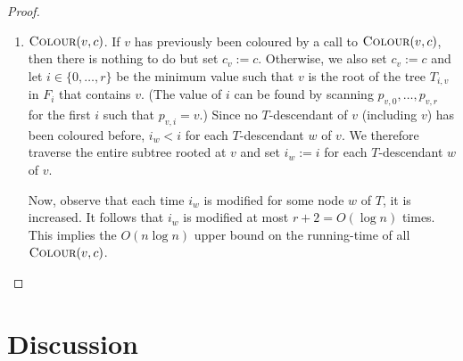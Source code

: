 \documentclass[kpfonts]{patmorin}
\begin{document}
\begin{proof}
\begin{enumerate}
     \item $\textsc{Colour}(v,c)$. If $v$ has previously been coloured by a call to $\textsc{Colour}(v,c)$, then there is nothing to do but set $c_v:=c$.  Otherwise, we also set $c_v:=c$ and let $i\in\{0,\ldots,r\}$ be the minimum value such that $v$ is the root of the tree $T_{i,v}$ in $F_i$ that contains $v$.  (The value of $i$ can be found by scanning $p_{v,0},\ldots,p_{v,r}$ for the first $i$ such that $p_{v,i}=v$.)   Since no $T$-descendant of $v$ (including $v$) has been coloured before, $i_w < i$ for each $T$-descendant $w$ of $v$.  We therefore traverse the entire subtree rooted at $v$ and set $i_w:=i$ for each $T$-descendant $w$ of $v$.

     Now, observe that each time $i_w$ is modified for some node $w$ of $T$, it is increased.  It follows that $i_w$ is modified at most $r+2=O(\log n)$ times.  This implies the $O(n\log n)$ upper bound on the running-time of all $\textsc{Colour}(v,c)$. \qedhere
   \end{enumerate}
 \end{proof}

\section{Discussion}




\end{document}
